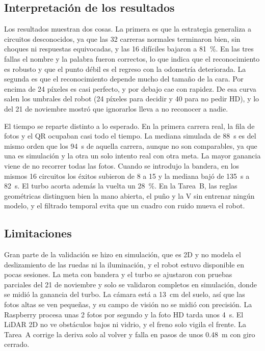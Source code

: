 \documentclass[11pt,a4paper]{article}
\begin{document}
\subsection{Interpretación de los resultados}

Los resultados muestran dos cosas. La primera es que la estrategia generaliza a circuitos desconocidos, ya que las 32 carreras normales terminaron bien, sin choques ni respuestas equivocadas, y las 16 difíciles bajaron a \SI{81}{\percent}. En las tres fallas el nombre y la palabra fueron correctos, lo que indica que el reconocimiento es robusto y que el punto débil es el regreso con la odometría deteriorada. La segunda es que el reconocimiento depende mucho del tamaño de la cara. Por encima de 24 píxeles es casi perfecto, y por debajo cae con rapidez. De esa curva salen los umbrales del robot (24 píxeles para decidir y 40 para no pedir HD), y lo del 21 de noviembre mostró que ignorarlos lleva a no reconocer a nadie.

El tiempo se reparte distinto a lo esperado. En la primera carrera real, la fila de fotos y el QR ocupaban casi todo el tiempo. La mediana simulada de \SI{88}{\second} es del mismo orden que los \SI{94}{\second} de aquella carrera, aunque no son comparables, ya que una es simulación y la otra un solo intento real con otra meta. La mayor ganancia viene de no recorrer todas las fotos. Cuando se introdujo la bandera, en los mismos 16 circuitos los éxitos subieron de 8 a 15 y la mediana bajó de \SI{135}{\second} a \SI{82}{\second}. El turbo acorta además la vuelta un \SI{28}{\percent}. En la Tarea~B, las reglas geométricas distinguen bien la mano abierta, el puño y la V sin entrenar ningún modelo, y el filtrado temporal evita que un cuadro con ruido mueva el robot.

\subsection{Limitaciones}

Gran parte de la validación se hizo en simulación, que es 2D y no modela el deslizamiento de las ruedas ni la iluminación, y el robot estuvo disponible en pocas sesiones. La meta con bandera y el turbo se ajustaron con pruebas parciales del 21 de noviembre y solo se validaron completos en simulación, donde se midió la ganancia del turbo. La cámara está a \SI{13}{\centi\meter} del suelo, así que las fotos altas se ven pequeñas, y su campo de visión no se midió con precisión. La Raspberry procesa unas 2 fotos por segundo y la foto HD tarda unos \SI{4}{\second}. El LiDAR 2D no ve obstáculos bajos ni vidrio, y el freno solo vigila el frente. La Tarea~A corrige la deriva solo al volver y falla en pasos de unos \SI{0,48}{\meter} con giro cerrado.
\end{document}
